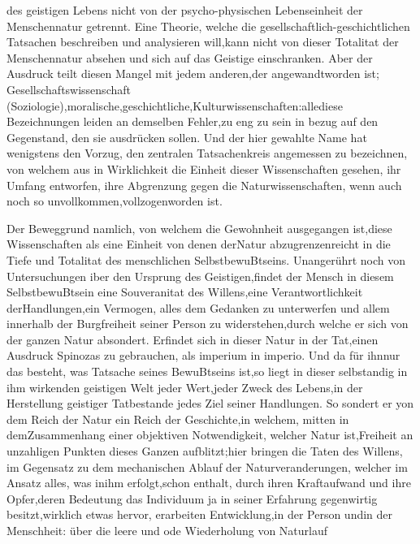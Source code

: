 \documentclass[12pt]{article}
\begin{document}
\fancyfoot[C]{}




\par des geistigen Lebens nicht von der psycho-physischen Lebenseinheit der Menschennatur getrennt. Eine Theorie, welche die gesellschaftlich-geschichtlichen Tatsachen beschreiben und analysieren will,kann nicht von dieser Totalitat der Menschennatur absehen und sich auf das Geistige einschranken. Aber der Ausdruck teilt diesen Mangel mit jedem anderen,der angewandtworden ist; Gesellschaftswissenschaft (Soziologie),moralische,geschichtliche,Kulturwissenschaften:allediese Bezeichnungen leiden an demselben Fehler,zu eng zu sein in bezug auf den Gegenstand, den sie ausdrücken sollen. Und der hier gewahlte Name hat wenigstens den Vorzug, den zentralen Tatsachenkreis angemessen zu bezeichnen, von welchem aus in Wirklichkeit die Einheit dieser Wissenschaften gesehen, ihr Umfang entworfen, ihre Abgrenzung gegen die Naturwissenschaften, wenn auch noch so unvollkommen,vollzogenworden ist.


\par Der Beweggrund namlich, von welchem die Gewohnheit ausgegangen ist,diese Wissenschaften als eine Einheit von denen derNatur abzugrenzenreicht in die Tiefe und Totalitat des menschlichen SelbstbewuBtseins. Unangerührt noch von Untersuchungen iber den Ursprung des Geistigen,findet der Mensch in diesem SelbstbewuBtsein eine Souveranitat des Willens,eine Verantwortlichkeit derHandlungen,ein Vermogen, alles dem Gedanken zu unterwerfen und allem innerhalb der Burgfreiheit seiner Person zu widerstehen,durch welche er sich von der ganzen Natur absondert. Erfindet sich in dieser Natur in der Tat,einen Ausdruck Spinozas zu gebrauchen, als imperium in imperio. Und da für ihnnur das besteht, was Tatsache seines BewuBtseins ist,so liegt in dieser selbstandig in ihm wirkenden geistigen Welt jeder Wert,jeder Zweck des Lebens,in der Herstellung geistiger Tatbestande jedes Ziel seiner Handlungen. So sondert er yon dem Reich der Natur ein Reich der Geschichte,in welchem, mitten in demZusammenhang einer objektiven Notwendigkeit, welcher Natur ist,Freiheit an unzahligen Punkten dieses Ganzen aufblitzt;hier bringen die Taten des Willens, im Gegensatz zu dem mechanischen Ablauf der Naturveranderungen, welcher im Ansatz alles, was inihm erfolgt,schon enthalt, durch ihren Kraftaufwand und ihre Opfer,deren Bedeutung das Individuum ja in seiner Erfahrung gegenwirtig besitzt,wirklich etwas hervor, erarbeiten Entwicklung,in der Person undin der Menschheit: über die leere und ode Wiederholung von Naturlauf





\clearpage
\end{document}
